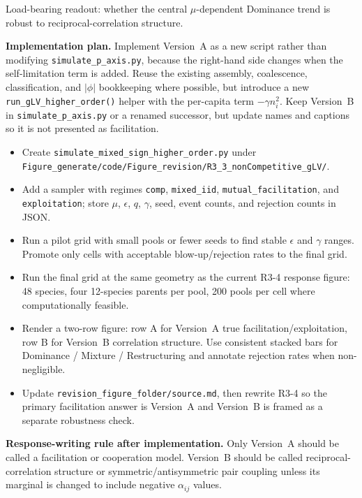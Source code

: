 \documentclass[11pt]{article}
\begin{document}
\begin{enumerate}[itemsep=5pt]
    Load-bearing readout: whether the central $\mu$-dependent Dominance trend is robust to reciprocal-correlation structure.
\end{enumerate}

\noindent\textbf{Implementation plan.}
Implement Version~A as a new script rather than modifying \texttt{simulate\_p\_axis.py}, because the right-hand side changes when the self-limitation term is added. Reuse the existing assembly, coalescence, classification, and $|\phi|$ bookkeeping where possible, but introduce a new \texttt{run\_gLV\_higher\_order()} helper with the per-capita term $-\gamma n_i^2$. Keep Version~B in \texttt{simulate\_p\_axis.py} or a renamed successor, but update names and captions so it is not presented as facilitation.

\begin{itemize}[itemsep=2pt]
    \item[\textbf{B1.}] Create \texttt{simulate\_mixed\_sign\_higher\_order.py} under \texttt{Figure\_generate/code/Figure\_revision/R3\_3\_nonCompetitive\_gLV/}.
    \item[\textbf{B2.}] Add a sampler with regimes \texttt{comp}, \texttt{mixed\_iid}, \texttt{mutual\_facilitation}, and \texttt{exploitation}; store $\mu$, $\epsilon$, $q$, $\gamma$, seed, event counts, and rejection counts in JSON.
    \item[\textbf{B3.}] Run a pilot grid with small pools or fewer seeds to find stable $\epsilon$ and $\gamma$ ranges. Promote only cells with acceptable blow-up/rejection rates to the final grid.
    \item[\textbf{B4.}] Run the final grid at the same geometry as the current R3-4 response figure: 48 species, four 12-species parents per pool, 200 pools per cell where computationally feasible.
    \item[\textbf{B5.}] Render a two-row figure: row A for Version~A true facilitation/exploitation, row B for Version~B correlation structure. Use consistent stacked bars for Dominance / Mixture / Restructuring and annotate rejection rates when non-negligible.
    \item[\textbf{B6.}] Update \texttt{revision\_figure\_folder/source.md}, then rewrite R3-4 so the primary facilitation answer is Version~A and Version~B is framed as a separate robustness check.
\end{itemize}

\noindent\textbf{Response-writing rule after implementation.}
Only Version~A should be called a facilitation or cooperation model. Version~B should be called reciprocal-correlation structure or symmetric/antisymmetric pair coupling unless its marginal is changed to include negative $\alpha_{ij}$ values.
\end{document}

